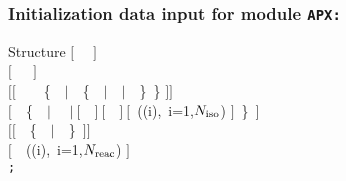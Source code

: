 \subsubsection{Initialization data input for module {\tt APX:}}\label{sect:descsapx1}

\vskip -0.8cm

\begin{DataStructure}{Structure }
$[$~ ~$]$ \\
$[$~~~$]$ \\
$[[$~~~~\{~~$|$~~\{~~$|$~~$|$~~\}~\} $]]$ \\
$[$~~\{~~$|$ ~~$|~[$~~$]~[$~~$]~[$~((i),~i=1,$N_{\rm iso}$) $]$~\}~$]$ \\
$[[$~~\{~~$|$~~\}~$]]$ \\
$[$~~((i),~i=1,$N_{\rm reac}$) $]$ \\
{\tt ;}
\end{DataStructure}

